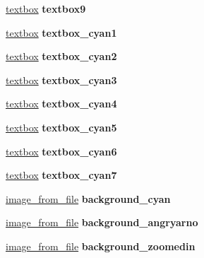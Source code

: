 \begin{DoxyCompactItemize}
\hyperlink{classtextbox}{textbox} {\bfseries textbox9}
\item 
\mbox{\label{classcutscene1_a6448ac3884b8a9dd2877934660fd87e5}} 
\hyperlink{classtextbox}{textbox} {\bfseries textbox\+\_\+cyan1}
\item 
\mbox{\label{classcutscene1_a62bef29a9dd0ffd69062c08ce202f49a}} 
\hyperlink{classtextbox}{textbox} {\bfseries textbox\+\_\+cyan2}
\item 
\mbox{\label{classcutscene1_acfdc4d22b48037b9b7a392c4479755b7}} 
\hyperlink{classtextbox}{textbox} {\bfseries textbox\+\_\+cyan3}
\item 
\mbox{\label{classcutscene1_a6b367439622ec7df18595144ca09588a}} 
\hyperlink{classtextbox}{textbox} {\bfseries textbox\+\_\+cyan4}
\item 
\mbox{\label{classcutscene1_a6661573c60e41f976fb8eb6c49fdd54f}} 
\hyperlink{classtextbox}{textbox} {\bfseries textbox\+\_\+cyan5}
\item 
\mbox{\label{classcutscene1_a0445521b887f74f30bf4f94200d62f7c}} 
\hyperlink{classtextbox}{textbox} {\bfseries textbox\+\_\+cyan6}
\item 
\mbox{\label{classcutscene1_a01de79d97bd4b9b08f6199e064afdec3}} 
\hyperlink{classtextbox}{textbox} {\bfseries textbox\+\_\+cyan7}
\item 
\mbox{\label{classcutscene1_a0dce06a8986bc773df3cb17a1d8b773d}} 
\hyperlink{classimage__from__file}{image\+\_\+from\+\_\+file} {\bfseries background\+\_\+cyan}
\item 
\mbox{\label{classcutscene1_a53e110ace6bfb5f79e41ad56a1c8b43a}} 
\hyperlink{classimage__from__file}{image\+\_\+from\+\_\+file} {\bfseries background\+\_\+angryarno}
\item 
\mbox{\label{classcutscene1_a9f2b170bf3436c825e5792a55313d8ed}} 
\hyperlink{classimage__from__file}{image\+\_\+from\+\_\+file} {\bfseries background\+\_\+zoomedin}
\item 
\mbox{\label{classcutscene1_a3e391cc7e44814a4a44aa8705b79208e}} 

\end{DoxyCompactItemize}
